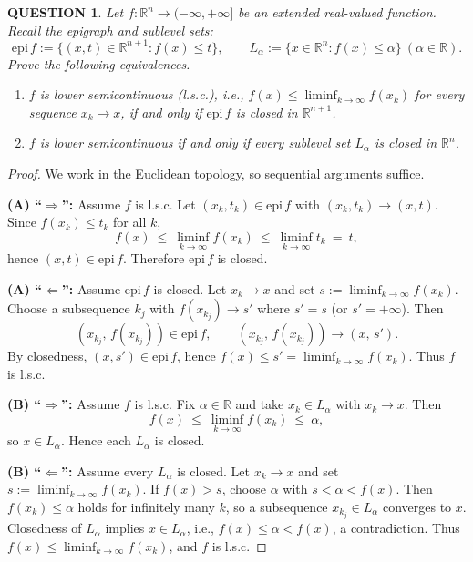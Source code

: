 \documentclass[12pt]{article}
\renewcommand{\(}{\left(}%
\renewcommand{\)}{\right)}%
\renewcommand{\[}{\left[}%
\renewcommand{\]}{\right]}%
\newtheorem{question}{QUESTION}[section]}
\newtheorem{proof}{Proof.}}
\begin{document}
  \begin{question}
Let $f:\mathbb{R}^n\to(-\infty,+\infty]$ be an extended real-valued function. Recall the \emph{epigraph} and \emph{sublevel sets}:
\begin{equation*}
\mathrm{epi}\,f := \{(x,t)\in\mathbb{R}^{n+1}: f(x)\le t\}, 
\qquad
L_\alpha := \{x\in\mathbb{R}^n : f(x)\le \alpha\}\ (\alpha\in\mathbb{R}).
\end{equation*}
Prove the following equivalences.
\begin{enumerate}
\item[(A)] $f$ is lower semicontinuous (l.s.c.), i.e., $f(x)\le \liminf_{k\to\infty} f(x_k)$ for every sequence $x_k\to x$, if and only if $\mathrm{epi}\,f$ is closed in $\mathbb{R}^{n+1}$.
\item[(B)] $f$ is lower semicontinuous if and only if every sublevel set $L_\alpha$ is closed in $\mathbb{R}^n$.
\end{enumerate}
\end{question}

\begin{proof}
We work in the Euclidean topology, so sequential arguments suffice.

\medskip
\noindent\textbf{(A) ``$\Rightarrow$'':} Assume $f$ is l.s.c. Let $(x_k,t_k)\in \mathrm{epi}\,f$ with $(x_k,t_k)\to (x,t)$. Since $f(x_k)\le t_k$ for all $k$,
\begin{equation*}
f(x)\ \le\ \liminf_{k\to\infty} f(x_k)\ \le\ \liminf_{k\to\infty} t_k\ =\ t,
\end{equation*}
hence $(x,t)\in \mathrm{epi}\,f$. Therefore $\mathrm{epi}\,f$ is closed.

\medskip
\noindent\textbf{(A) ``$\Leftarrow$'':} Assume $\mathrm{epi}\,f$ is closed. Let $x_k\to x$ and set $s:=\liminf_{k\to\infty} f(x_k)$. Choose a subsequence $k_j$ with $f(x_{k_j})\to s'$ where $s'=s$ (or $s'=+\infty$). Then
\begin{equation*}
(x_{k_j},\,f(x_{k_j}))\in \mathrm{epi}\,f,\qquad (x_{k_j},\,f(x_{k_j}))\to (x,\,s').
\end{equation*}
By closedness, $(x,s')\in\mathrm{epi}\,f$, hence $f(x)\le s'=\liminf_{k\to\infty} f(x_k)$. Thus $f$ is l.s.c.

\medskip
\noindent\textbf{(B) ``$\Rightarrow$'':} Assume $f$ is l.s.c. Fix $\alpha\in\mathbb{R}$ and take $x_k\in L_\alpha$ with $x_k\to x$. Then
\begin{equation*}
f(x)\ \le\ \liminf_{k\to\infty} f(x_k)\ \le\ \alpha,
\end{equation*}
so $x\in L_\alpha$. Hence each $L_\alpha$ is closed.

\medskip
\noindent\textbf{(B) ``$\Leftarrow$'':} Assume every $L_\alpha$ is closed. Let $x_k\to x$ and set $s:=\liminf_{k\to\infty} f(x_k)$. If $f(x)>s$, choose $\alpha$ with $s<\alpha<f(x)$. Then $f(x_k)\le\alpha$ holds for infinitely many $k$, so a subsequence $x_{k_j}\in L_\alpha$ converges to $x$. Closedness of $L_\alpha$ implies $x\in L_\alpha$, i.e., $f(x)\le\alpha<f(x)$, a contradiction. Thus $f(x)\le \liminf_{k\to\infty} f(x_k)$, and $f$ is l.s.c.
\end{proof}
\end{document}
